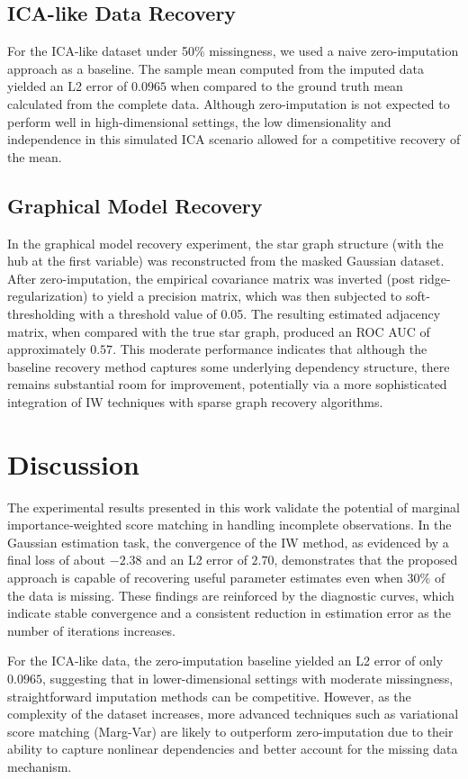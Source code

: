 \documentclass{article}
\begin{document}
\subsection{ICA-like Data Recovery}
For the ICA-like dataset under 50\% missingness, we used a naive zero-imputation approach as a baseline. The sample mean computed from the imputed data yielded an L2 error of $0.0965$ when compared to the ground truth mean calculated from the complete data. Although zero-imputation is not expected to perform well in high-dimensional settings, the low dimensionality and independence in this simulated ICA scenario allowed for a competitive recovery of the mean.

\subsection{Graphical Model Recovery}
In the graphical model recovery experiment, the star graph structure (with the hub at the first variable) was reconstructed from the masked Gaussian dataset. After zero-imputation, the empirical covariance matrix was inverted (post ridge-regularization) to yield a precision matrix, which was then subjected to soft-thresholding with a threshold value of 0.05. The resulting estimated adjacency matrix, when compared with the true star graph, produced an ROC AUC of approximately $0.57$. This moderate performance indicates that although the baseline recovery method captures some underlying dependency structure, there remains substantial room for improvement, potentially via a more sophisticated integration of IW techniques with sparse graph recovery algorithms.

\section{Discussion}
The experimental results presented in this work validate the potential of marginal importance‐weighted score matching in handling incomplete observations. In the Gaussian estimation task, the convergence of the IW method, as evidenced by a final loss of about $-2.38$ and an L2 error of $2.70$, demonstrates that the proposed approach is capable of recovering useful parameter estimates even when 30\% of the data is missing. These findings are reinforced by the diagnostic curves, which indicate stable convergence and a consistent reduction in estimation error as the number of iterations increases.

For the ICA-like data, the zero-imputation baseline yielded an L2 error of only $0.0965$, suggesting that in lower-dimensional settings with moderate missingness, straightforward imputation methods can be competitive. However, as the complexity of the dataset increases, more advanced techniques such as variational score matching (Marg-Var) are likely to outperform zero-imputation due to their ability to capture nonlinear dependencies and better account for the missing data mechanism.
\end{document}
